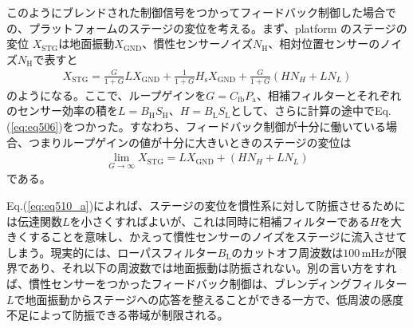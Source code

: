 このようにブレンドされた制御信号をつかってフィードバック制御した場合での、プラットフォームのステージの変位を考える。まず、platform のステージの変位 $X_{\mathrm{STG}}$は地面振動$X_{\mathrm{GND}}$、慣性センサーノイズ$N_{\mathrm{H}}$、相対位置センサーのノイズ$N_{\mathrm{H}}$で表すと
\begin{eqnarray}
  X_{\mathrm{STG}} = \frac{G}{1+G}LX_{\mathrm{GND}} + \frac{1}{1+G}H_{\mathrm{s}}X_{\mathrm{GND}} + \frac{G}{1+G}\left(HN_{H}+LN_{L}\right)   \label{eq:eq510}
\end{eqnarray}
のようになる。ここで、ループゲインを$G=C_{\mathrm{fb}}P_{\mathrm{a}}$、相補フィルターとそれぞれのセンサー効率の積を$L=B_{\mathrm{H}}S_{\mathrm{H}}$、$H=B_{\mathrm{L}}S_{\mathrm{L}}$として、さらに計算の途中でEq.(\ref{eq:eq506})をつかった。すなわち、フィードバック制御が十分に働いている場合、つまりループゲインの値が十分に大きいときのステージの変位は
\begin{eqnarray}
  \lim_{G\to\infty} X_{\mathrm{STG}} = LX_{\mathrm{GND}} + \left(HN_{H}+LN_{L}\right) \label{eq:eq510_a}
\end{eqnarray}
である。

Eq.(\ref{eq:eq510_a})によれば、ステージの変位を慣性系に対して防振させるためには伝達関数$L$を小さくすればよいが、これは同時に相補フィルターである$H$を大きくすることを意味し、かえって慣性センサーのノイズをステージに流入させてしまう。現実的には、ローパスフィルター$B_{\mathrm{L}}$のカットオフ周波数は$100\,\mathrm{mHz}$が限界であり、それ以下の周波数では地面振動は防振されない。別の言い方をすれば、慣性センサーをつかったフィードバック制御は、ブレンディングフィルター$L$で地面振動からステージへの応答を整えることができる一方で、低周波の感度不足によって防振できる帯域が制限される。



